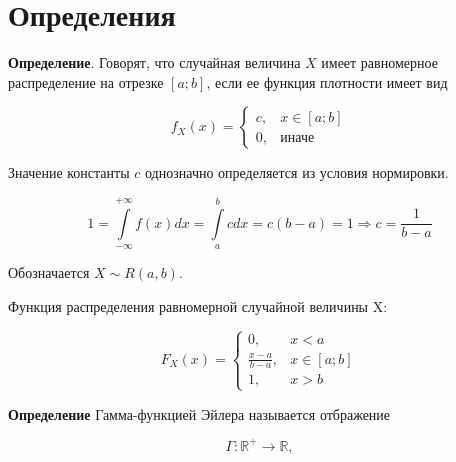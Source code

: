 \chapter{Определения}

\textbf{Определение}. Говорят, что случайная величина $X$ имеет равномерное распределение на отрезке $[a; b]$, если ее функция плотности имеет вид

\begin{equation*}
	f_{X}(x) =
	\begin{cases}
		c, & x \in [a;b]\\
		0, & \text{иначе}
	\end{cases}
\end{equation*}

Значение константы $c$ однозначно определяется из условия нормировки.

\begin{equation*}
	1 = \int\limits_{-\infty}^{+\infty}f(x)dx =
	\int\limits_{a}^{b}cdx =
	c(b - a) = 1
	\Longrightarrow
	c = \frac{1}{b - a}	
\end{equation*}

Обозначается $X \sim R(a, b)$.

Функция распределения равномерной случайной величины X:

\begin{equation*}
	F_X(x) = 
	\begin{cases}
		0, & x < a\\
		\frac{x-a}{b-a}, & x \in [a;b]\\
		1, & x > b
	\end{cases}
\end{equation*}

\newpage
\textbf{Определение} Гамма-функцией Эйлера называется отбражение

\begin{equation*}
	\Gamma: \mathds{R}^{+} \longrightarrow \mathds{R},
\end{equation*}

